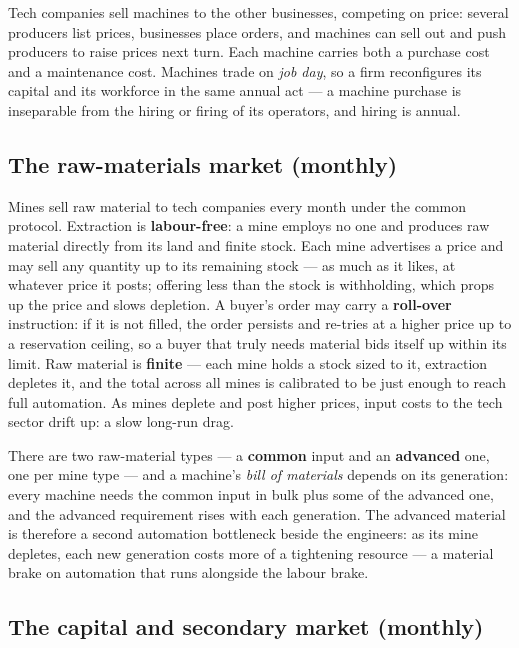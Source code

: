 \documentclass[11pt]{article}
\begin{document}
Tech companies sell machines to the other businesses, competing on price:
several producers list prices, businesses place orders, and machines can sell
out and push producers to raise prices next turn. Each machine carries both a
purchase cost and a maintenance cost. Machines trade on \emph{job day}, so a firm
reconfigures its capital and its workforce in the same annual act --- a machine
purchase is inseparable from the hiring or firing of its operators, and hiring is
annual.

\subsection{The raw-materials market (monthly)}
\label{sec:raw}

Mines sell raw material to tech companies every month under the common protocol.
Extraction is \textbf{labour-free}: a mine employs no one and produces raw
material directly from its land and finite stock. Each mine advertises a price
and may sell any quantity up to its remaining stock --- as much as it likes, at
whatever price it posts; offering less than the stock is withholding, which props
up the price and slows depletion. A buyer's order may carry a \textbf{roll-over}
instruction: if it is not filled, the order persists and re-tries at a higher
price up to a reservation ceiling, so a buyer that truly needs material bids
itself up within its limit. Raw material is \textbf{finite} --- each mine holds
a stock sized to it, extraction depletes it, and the total across all mines is
calibrated to be just enough to reach full automation. As mines deplete and post
higher prices, input costs to the tech sector drift up: a slow long-run drag.

There are two raw-material types --- a \textbf{common} input and an
\textbf{advanced} one, one per mine type --- and a machine's \emph{bill of
materials} depends on its generation: every machine needs the common input in
bulk plus some of the advanced one, and the advanced requirement rises with each
generation. The advanced material is therefore a second automation bottleneck
beside the engineers: as its mine depletes, each new generation costs more of a
tightening resource --- a material brake on automation that runs alongside the
labour brake.

\subsection{The capital and secondary market (monthly)}
\label{sec:capital-market}
\end{document}
